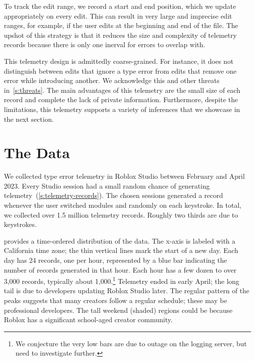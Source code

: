 \documentclass[english,submission,cleveref]{programming}
\begin{document}
To track the edit range, we record a start and end position, which we
update appropriately on every edit. This can result in very large and
imprecise edit ranges, for example, if the user edits at the beginning and end
of the file.
The upshot of this strategy is that it reduces the size and complexity of
telemetry records because there is only one inerval for errors to overlap with.

This telemetry design is admittedly coarse-grained.
For instance, it does not distinguish between edits that ignore a type
error from edits that remove one error while introducing another.
We acknowledge this and other threats in~\cref{s:threats}.
The main advantages of this telemetry are the small size of each record
and complete the lack of private information.
Furthermore, despite the limitations, this telemetry supports a variety of
inferences that we showcase in the next section.


\section{The Data}
\label{s:data}

We collected type error telemetry in Roblox Studio between February
and April 2023.
Every Studio session had a small random chance of generating
telemetry~(\cref{s:telemetry-records}).
The chosen sessions generated a record whenever the user switched modules and
randomly on each keystroke.
In total, we collected over 1.5 million telemetry records.
Roughly two thirds are due to keystrokes.

 provides a time-ordered distribution of the data.
The x-axis is labeled with a California time zone; the thin vertical lines
mark the start of a new day.
Each day has 24 records, one per hour, represented by a blue bar
indicating the number of records generated in that hour.
Each hour has a few dozen to over 3,000 records, typically about
1,000.\footnote{We conjecture the very low bars are due to outage on
  the logging server, but need to investigate further.}
Telemetry ended in early April; the long tail is due to developers
updating Roblox Studio later.
The regular pattern of the peaks suggests that many creators
follow a regular schedule; these may be
professional developers.
The tall weekend (shaded) regions could be because
Roblox has a significant school-aged creator community.
\end{document}

